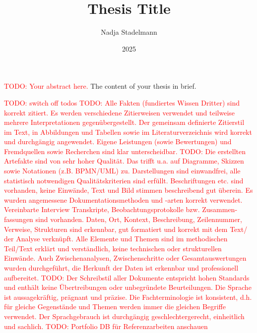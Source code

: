 \documentclass[12pt, a4paper, oneside]{book}   	%
\author{Nadja Stadelmann}                       %
\title{Thesis Title}                            %
\subtitle{\large \todo{subtitle}}               %
\date{2025}                                     %
\renewcommand{\todo}[1]{\textcolor{red}{TODO: #1}}
\begin{document}
	\english                                        %
	\maketitle
	
	
	\begin{abstractstyle}{\hsummary}
		\todo{Your abstract here.}
	    The content of your thesis in brief.
	\end{abstractstyle}
	
	\tableofcontents
	
	\listoftodos
	\todo{switch off todos} \linebreak
	\todo{Alle Fakten (fundiertes Wissen Dritter) sind korrekt zitiert. Es werden verschiedene Zitierweisen verwendet und teilweise mehrere Interpretationen gegenübergestellt. Der gemeinsam definierte Zitierstil im Text, in Abbildungen und Tabellen sowie im Literaturverzeichnis wird korrekt und durchgängig angewendet. Eigene Leistungen (sowie Bewertungen) und Fremdquellen sowie Recherchen sind klar unterscheidbar.} \linebreak
	\todo{Die erstellten Artefakte sind von sehr hoher Qualität. Das trifft u.a. auf Diagramme, Skizzen sowie Notationen (z.B. BPMN/UML) zu. Darstellungen sind einwandfrei, alle statistisch notwendigen Qualitätskriterien sind erfüllt. Beschriftungen etc. sind vorhanden, keine Einwände, Text und Bild stimmen beschreibend gut überein. Es wurden angemessene Dokumentationsmethoden und -arten korrekt verwendet. Vereinbarte Interview Transkripte, Beobachtungsprotokolle bzw. Zusammen-fassungen sind vorhanden. Daten, Ort, Kontext, Beschreibung, Zeilennummer, Verweise, Strukturen sind erkennbar, gut formatiert und korrekt mit dem Text/ der Analyse verknüpft. Alle Elemente und Themen sind im methodischen Teil/Text erklärt und verständlich, keine technischen oder strukturellen Einwände. Auch Zwischenanalysen, Zwischenschritte oder Gesamtauswertungen wurden durchgeführt, die Herkunft der Daten ist erkennbar und professionell aufbereitet.} \linebreak
	\todo{Der Schreibstil aller Dokumente entspricht hohen Standards und enthält keine Übertreibungen oder unbegründete Beurteilungen. Die Sprache ist aussagekräftig, prägnant und präzise. Die Fachterminologie ist konsistent, d.h. für gleiche Gegenstände und Themen werden immer die gleichen Begriffe verwendet. Der Sprachgebrauch ist durchgängig geschlechtergerecht, einheitlich und sachlich.}
	\todo{Portfolio DB für Referenzarbeiten anschauen}
	
\end{document}
